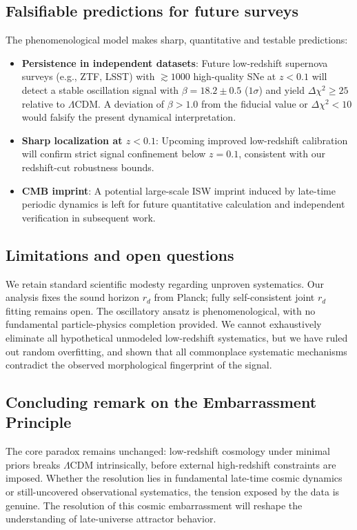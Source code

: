 \documentclass[10pt,a4paper]{article}
\begin{document}
\subsection{Falsifiable predictions for future surveys}
The phenomenological model makes sharp, quantitative and testable predictions:
\begin{itemize}
    \item \textbf{Persistence in independent datasets}: Future low-redshift supernova surveys (e.g., ZTF, LSST) with $\gtrsim 1000$ high-quality SNe at $z<0.1$ will detect a stable oscillation signal with $\beta=18.2\pm0.5$ ($1\sigma$) and yield $\Delta\chi^2\ge25$ relative to $\Lambda$CDM. A deviation of $\beta>1.0$ from the fiducial value or $\Delta\chi^2<10$ would falsify the present dynamical interpretation.
    \item \textbf{Sharp localization at $z<0.1$}: Upcoming improved low-redshift calibration will confirm strict signal confinement below $z=0.1$, consistent with our redshift-cut robustness bounds.
    \item \textbf{CMB imprint}: A potential large-scale ISW imprint induced by late-time periodic dynamics is left for future quantitative calculation and independent verification in subsequent work.
\end{itemize}

\subsection{Limitations and open questions}
We retain standard scientific modesty regarding unproven systematics. Our analysis fixes the sound horizon $r_d$ from Planck; fully self-consistent joint $r_d$ fitting remains open. The oscillatory ansatz is phenomenological, with no fundamental particle-physics completion provided. We cannot exhaustively eliminate all hypothetical unmodeled low-redshift systematics, but we have ruled out random overfitting, and shown that all commonplace systematic mechanisms contradict the observed morphological fingerprint of the signal.

\subsection{Concluding remark on the Embarrassment Principle}
The core paradox remains unchanged: low-redshift cosmology under minimal priors breaks $\Lambda$CDM intrinsically, before external high-redshift constraints are imposed. Whether the resolution lies in fundamental late-time cosmic dynamics or still-uncovered observational systematics, the tension exposed by the data is genuine. The resolution of this cosmic embarrassment will reshape the understanding of late-universe attractor behavior.
\end{document}

